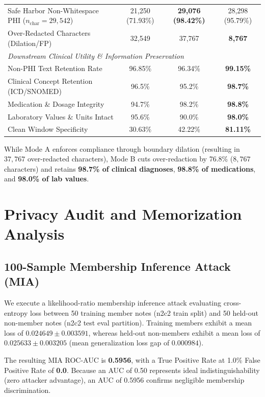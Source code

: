 \documentclass[11pt,a4paper]{article}
\begin{document}
\begin{table}[t]
\begin{tabular}{l ccc}
Safe Harbor Non-Whitespace PHI ($n_{\text{char}} = 29,542$) & 21,250 (71.93\%) & \textbf{29,076 (98.42\%)} & 28,298 (95.79\%) \\
Over-Redacted Characters (Dilation/FP) & 32,549 & 37,767 & \textbf{8,767} \\
\midrule
\multicolumn{4}{l}{\textit{Downstream Clinical Utility \& Information Preservation}} \\[2pt]
Non-PHI Text Retention Rate & 96.85\% & 96.34\% & \textbf{99.15\%} \\
Clinical Concept Retention (ICD/SNOMED) & 96.5\% & 95.2\% & \textbf{98.7\%} \\
Medication \& Dosage Integrity & 94.7\% & 98.2\% & \textbf{98.8\%} \\
Laboratory Values \& Units Intact & 95.6\% & 90.0\% & \textbf{98.0\%} \\
Clean Window Specificity & 30.63\% & 42.22\% & \textbf{81.11\%} \\
\bottomrule
\end{tabular}
\end{table}

While Mode A enforces compliance through boundary dilation (resulting in $37,767$ over-redacted characters), Mode B cuts over-redaction by 76.8\% ($8,767$ characters) and retains \textbf{98.7\% of clinical diagnoses}, \textbf{98.8\% of medications}, and \textbf{98.0\% of lab values}.

\section{Privacy Audit and Memorization Analysis}

\subsection{100-Sample Membership Inference Attack (MIA)}
We execute a likelihood-ratio membership inference attack evaluating cross-entropy loss between 50 training member notes (n2c2 train split) and 50 held-out non-member notes (n2c2 test eval partition). Training members exhibit a mean loss of $0.024649 \pm 0.003591$, whereas held-out non-members exhibit a mean loss of $0.025633 \pm 0.003205$ (mean generalization loss gap of $0.000984$). 

The resulting MIA ROC-AUC is \textbf{0.5956}, with a True Positive Rate at 1.0\% False Positive Rate of \textbf{0.0}. Because an AUC of 0.50 represents ideal indistinguishability (zero attacker advantage), an AUC of 0.5956 confirms negligible membership discrimination.
\end{document}
